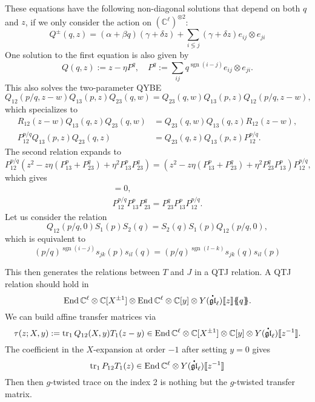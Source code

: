 \documentclass[11pt]{report}
\newcommand*{\dt}[1]{%
  \accentset{\mbox{\large\bfseries .}}{#1}}
\theoremstyle{definition}
\theoremstyle{remark}
\theoremstyle{remark}
\newcommand{\End}{\operatorname{End}}
\newcommand{\C}{\mathbb{C}}
\newcommand{\llbraces}{\{\!\!\{}
\newcommand{\rrbraces}{\}\!\!\}}
\begin{document}
These equations have the following non-diagonal solutions that depend on both $q$ and $z$, if we only consider the action on $(\C^\ell)^{\otimes 2}$:
\begin{equation*}
Q^\pm(q,z) = (\alpha + \beta q)(\gamma + \delta z) + \sum_{i \lessgtr j} (\gamma+\delta z) e_{ij} \otimes e_{ji}
\end{equation*}
One solution to the first equation is also given by
\begin{equation*}
Q(q,z) := z - \eta P^q, \quad P^q := \sum_{ij} q^{\operatorname{sgn}(i-j)} e_{ij} \otimes e_{ji}.
\end{equation*}
This also solves the two-parameter QYBE
\begin{equation*}
Q_{12}(p/q,z-w) Q_{13}(p,z) Q_{23}(q,w) = Q_{23}(q,w) Q_{13}(p,z) Q_{12}(p/q,z-w),
\end{equation*}
which specializes to
\begin{align*}
R_{12}(z-w) Q_{13}(q,z) Q_{23}(q,w) &= Q_{23}(q,w) Q_{13}(q,z) R_{12}(z-w), \\
P_{12}^{p/q} Q_{13}(p,z) Q_{23}(q,z) &= Q_{23}(q,z) Q_{13}(p,z) P_{12}^{p/q}.
\end{align*}
The second relation expands to
\begin{equation*}
P_{12}^{p/q} (z^2 - z \eta (P_{13}^p + P_{23}^q) + \eta^2 P_{13}^p P_{23}^q) = (z^2 - z \eta (P_{13}^p + P_{23}^q) + \eta^2 P_{23}^q P_{13}^p) P_{12}^{p/q},
\end{equation*}
which gives
\begin{align*}
[P_{12}^{p/q},P_{13}^p + P_{23}^q] = 0, \\
P_{12}^{p/q} P_{13}^p P_{23}^q = P_{23}^q P_{13}^p P_{12}^{p/q}.
\end{align*}
Let us consider the relation
\begin{equation*}
Q_{12}(p/q,0) S_1(p) S_2(q) = S_2(q) S_1(p) Q_{12}(p/q,0),
\end{equation*}
which is equivalent to
\begin{equation*}
(p/q)^{\operatorname{sgn}(i-j)} s_{jk}(p) s_{il}(q) = (p/q)^{\operatorname{sgn}(l-k)} s_{jk}(q) s_{il}(p)
\end{equation*}

This then generates the relations between $T$ and $J$ in a QTJ relation. A QTJ relation should hold in
\begin{equation*}
\End \C^\ell \otimes \C[X^{\pm 1}] \otimes \End \C^\ell \otimes \C[y] \otimes Y(\dt{\mathfrak{gl}}_\ell)\llbracket z \rrbracket \llbraces q \rrbraces.
\end{equation*}
We can build affine transfer matrices via
\begin{equation*}
\tau(z;X,y) := \operatorname{tr}_1 Q_{12}(X,y) T_1(z-y) \in \End \C^\ell \otimes \C[X^{\pm 1}] \otimes \C[y] \otimes Y(\dt{\mathfrak{gl}}_\ell)\llbracket z^{-1} \rrbracket.
\end{equation*}
The coefficient in the $X$-expansion at order $-1$ after setting $y = 0$ gives
\begin{equation*}
\operatorname{tr}_1 P_{12} T_1(z) \in \End \C^\ell \otimes Y(\dt{\mathfrak{gl}}_\ell)\llbracket z^{-1} \rrbracket
\end{equation*}
Then then $g$-twisted trace on the index 2 is nothing but the $g$-twisted transfer matrix.
\end{document}
